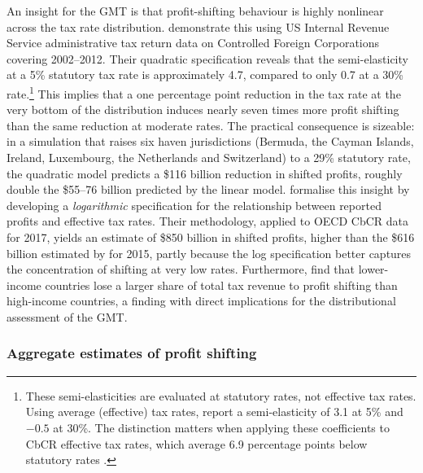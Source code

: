 \documentclass[11pt,a4paper]{article}
\begin{document}
An insight for the GMT is that profit-shifting behaviour is highly nonlinear across the tax rate distribution. \citet{dowd2017} demonstrate this using US Internal Revenue Service administrative tax return data on Controlled Foreign Corporations covering 2002--2012. Their quadratic specification reveals that the semi-elasticity at a 5\% statutory tax rate is approximately 4.7, compared to only 0.7 at a 30\% rate.\footnote{These semi-elasticities are evaluated at statutory rates, not effective tax rates. Using average (effective) tax rates, \citet{dowd2017} report a semi-elasticity of 3.1 at 5\% and $-0.5$ at 30\%. The distinction matters when applying these coefficients to CbCR effective tax rates, which average 6.9 percentage points below statutory rates \citep{hugger2026}.} This implies that a one percentage point reduction in the tax rate at the very bottom of the distribution induces nearly seven times more profit shifting than the same reduction at moderate rates. The practical consequence is sizeable: in a simulation that raises six haven jurisdictions (Bermuda, the Cayman Islands, Ireland, Luxembourg, the Netherlands and Switzerland) to a 29\% statutory rate, the quadratic model predicts a \$116 billion reduction in shifted profits, roughly double the \$55--76 billion predicted by the linear model. \citet{garcia-bernardo2024} formalise this insight by developing a \emph{logarithmic} specification for the relationship between reported profits and effective tax rates. Their methodology, applied to OECD CbCR data for 2017, yields an estimate of \$850 billion in shifted profits, higher than the \$616 billion estimated by \citet{torslov2023} for 2015, partly because the log specification better captures the concentration of shifting at very low rates. Furthermore, \citet{garcia-bernardo2024} find that lower-income countries lose a larger share of total tax revenue to profit shifting than high-income countries, a finding with direct implications for the distributional assessment of the GMT.

\subsubsection{Aggregate estimates of profit shifting}
\end{document}
